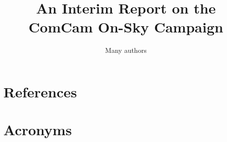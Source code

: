 \documentclass[SE,lsstdraft,authoryear,toc]{lsstdoc}
\title{An Interim Report on the ComCam On-Sky Campaign}
\author{%
Many authors
}
\date{\vcsDate}
\begin{document}
\maketitle












































\appendix
\section{References} \label{sec:bib}
\renewcommand{\refname}{} %


\section{Acronyms} \label{sec:acronyms}

\end{document}
